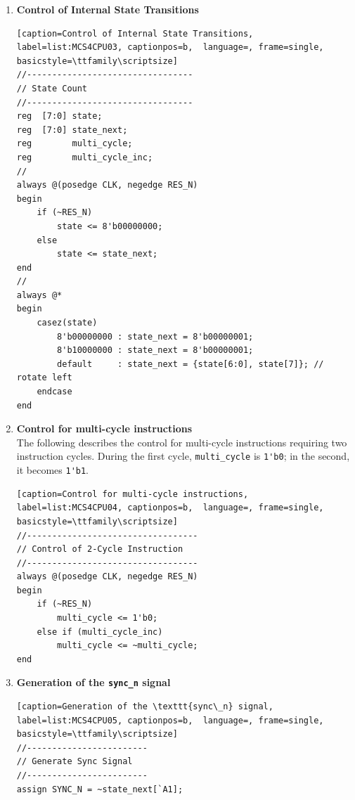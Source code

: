 \begin{enumerate}[(1)]
\item \textbf{Control of Internal State Transitions}\\
\begin{lstlisting}[caption=Control of Internal State Transitions, 
label=list:MCS4CPU03, captionpos=b,  language=, frame=single, basicstyle=\ttfamily\scriptsize]
//---------------------------------
// State Count
//---------------------------------
reg  [7:0] state;
reg  [7:0] state_next;
reg        multi_cycle;
reg        multi_cycle_inc;
//
always @(posedge CLK, negedge RES_N)
begin
    if (~RES_N)
        state <= 8'b00000000;
    else
        state <= state_next;
end
//
always @*
begin
    casez(state)
        8'b00000000 : state_next = 8'b00000001;
        8'b10000000 : state_next = 8'b00000001;
        default     : state_next = {state[6:0], state[7]}; // rotate left
    endcase
end
\end{lstlisting}

\item \textbf{Control for multi-cycle instructions}\\
The following describes the control for multi-cycle instructions requiring two instruction cycles. During the first cycle, \verb|multi_cycle| is \verb|1'b0|; in the second, it becomes \verb|1'b1|. 
\\
\begin{lstlisting}[caption=Control for multi-cycle instructions, 
label=list:MCS4CPU04, captionpos=b,  language=, frame=single, basicstyle=\ttfamily\scriptsize]
//----------------------------------
// Control of 2-Cycle Instruction
//----------------------------------
always @(posedge CLK, negedge RES_N)
begin
    if (~RES_N)
        multi_cycle <= 1'b0;
    else if (multi_cycle_inc)
        multi_cycle <= ~multi_cycle;
end
\end{lstlisting}

\item \textbf{Generation of the \texttt{sync\_n} signal}\\
\begin{lstlisting}[caption=Generation of the \texttt{sync\_n} signal, 
label=list:MCS4CPU05, captionpos=b,  language=, frame=single, basicstyle=\ttfamily\scriptsize]
//------------------------
// Generate Sync Signal
//------------------------
assign SYNC_N = ~state_next[`A1];
\end{lstlisting}


\end{enumerate}
